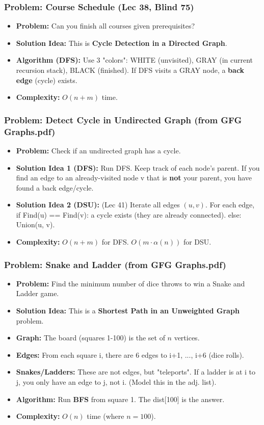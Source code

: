 \subsubsection{Problem: Course Schedule (Lec 38, Blind 75)}
\begin{itemize}
\item \textbf{Problem:} Can you finish all courses given prerequisites?
\item \textbf{Solution Idea:} This is \textbf{Cycle Detection in a Directed Graph}.
\item \textbf{Algorithm (DFS):} Use 3 "colors": WHITE (unvisited), GRAY (in current recursion stack), BLACK (finished). If DFS visits a GRAY node, a \textbf{back edge} (cycle) exists.
\item \textbf{Complexity:} $O(n+m)$ time.
\end{itemize}

\subsubsection{Problem: Detect Cycle in Undirected Graph (from GFG Graphs.pdf)}
\begin{itemize}
\item \textbf{Problem:} Check if an undirected graph has a cycle.
\item \textbf{Solution Idea 1 (DFS):} Run DFS. Keep track of each node's parent. If you find an edge to an already-visited node v that is \textbf{not} your parent, you have found a back edge/cycle.
\item \textbf{Solution Idea 2 (DSU):} (Lec 41) Iterate all edges $(u, v)$. For each edge, if Find(u) == Find(v): a cycle exists (they are already connected). else: Union(u, v).
\item \textbf{Complexity:} $O(n+m)$ for DFS. $O(m \cdot \alpha(n))$ for DSU.
\end{itemize}

\subsubsection{Problem: Snake and Ladder (from GFG Graphs.pdf)}
\begin{itemize}
\item \textbf{Problem:} Find the minimum number of dice throws to win a Snake and Ladder game.
\item \textbf{Solution Idea:} This is a \textbf{Shortest Path in an Unweighted Graph} problem.
\item \textbf{Graph:} The board (squares 1-100) is the set of $n$ vertices.
\item \textbf{Edges:} From each square i, there are 6 edges to i+1, ..., i+6 (dice rolls).
\item \textbf{Snakes/Ladders:} These are not edges, but "teleports". If a ladder is at i to j, you only have an edge to j, not i. (Model this in the adj. list).
\item \textbf{Algorithm:} Run \textbf{BFS} from square 1. The dist[100] is the answer.
\item \textbf{Complexity:} $O(n)$ time (where $n=100$).
\end{itemize}

